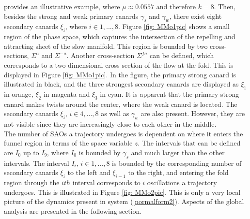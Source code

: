 \citet{MMO} provides an illustrative example, where $ \mu \approx 0.0557$ and therefore $k=8$. Then, besides the strong and weak primary canards $\gamma_s$ and $\gamma_w$, there exist eight secondary canards $\xi_i$, where $ i \in 1,...,8$.
Figure \ref{fig: MMo1pic} shows a small region of the phase space, which captures the intersection of the repelling and attracting sheet of the slow manifold. This region is bounded by two cross-sections, $\Sigma^a$ and $\Sigma^{-a}$.
Another cross-section $\Sigma^{fn}$ can be defined, which corresponds to a two dimensional cross-section of the flow at the fold. This is displayed in Figure \ref{fig: MMo1pic}. In the figure, the primary strong canard is illustrated in black, and the three strongest secondary canards are displayed as $\xi_1$ in orange, $\xi_2$ in magenta and $\xi_3$ in cyan. It is apparent that the primary strong canard makes  twists around the center, where the weak canard is located. The secondary canards $\xi_i$, $ i \in 4,...,8$ as well as $\gamma_w$ are also present. However, they are not visible since they are increasingly close to each other in the middle.\\

The number of SAOs a trajectory undergoes is dependent on where it enters the funnel region in terms of the space variable $z$. The intervals that can be defined are $I_0$ up to $I_9$, where $I_0$ is bounded by $\gamma_s$ and much larger than the other intervals. The interval $I_i$, $i \in 1, ..., 8$ is bounded by the corresponding number of secondary canards $\xi_i$ to the left and $\xi_{i-1}$ to the right, and entering the fold region through the $ith$ interval corresponds to $i$ oscillations a trajectory undergoes. This is illustrated in Figure \ref{fig: MMo2pic}. This is only a very local picture of the dynamics present in system (\ref{normalform2}). Aspects of the global analysis are presented in the following section.
